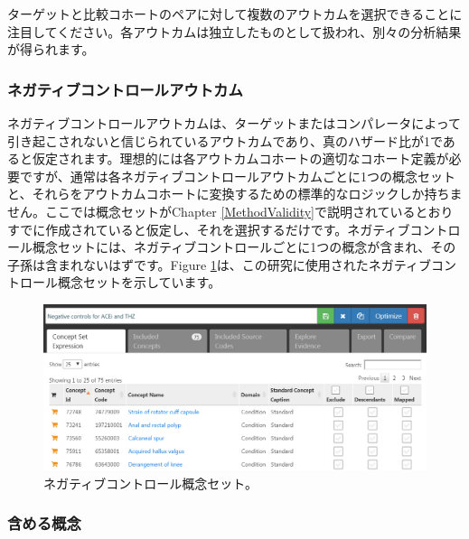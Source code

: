 \documentclass[
  11pt]{book}
\theoremstyle{definition}
\theoremstyle{definition}
\theoremstyle{definition}
\theoremstyle{definition}
\theoremstyle{remark}
\begin{document}
ターゲットと比較コホートのペアに対して複数のアウトカムを選択できることに注目してください。各アウトカムは独立したものとして扱われ、別々の分析結果が得られます。

\subsubsection*{ネガティブコントロールアウトカム}\label{ux30cdux30acux30c6ux30a3ux30d6ux30b3ux30f3ux30c8ux30edux30fcux30ebux30a2ux30a6ux30c8ux30abux30e0}

ネガティブコントロールアウトカムは、ターゲットまたはコンパレータによって引き起こされないと信じられているアウトカムであり、真のハザード比が1であると仮定されます。理想的には各アウトカムコホートの適切なコホート定義が必要ですが、通常は各ネガティブコントロールアウトカムごとに1つの概念セットと、それらをアウトカムコホートに変換するための標準的なロジックしか持ちません。ここでは概念セットがChapter \ref{MethodValidity}で説明されているとおりすでに作成されていると仮定し、それを選択するだけです。ネガティブコントロール概念セットには、ネガティブコントロールごとに1つの概念が含まれ、その子孫は含まれないはずです。Figure \ref{fig:ncConceptSet}は、この研究に使用されたネガティブコントロール概念セットを示しています。

\begin{figure}

{\centering \includegraphics[width=1\linewidth]{images/PopulationLevelEstimation/ncConceptSet} 

}

\caption{ネガティブコントロール概念セット。}\label{fig:ncConceptSet}
\end{figure}

\subsubsection*{含める概念}\label{ux542bux3081ux308bux6982ux5ff5}
\end{document}
